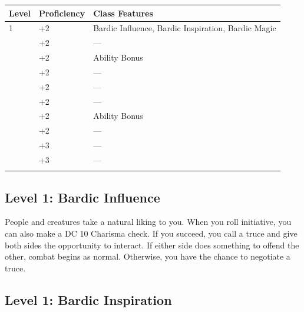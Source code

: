 \documentclass[12pt,letterpaper,twocolumn,openany,nodeprecatedcode,bg=none]{dndbook}
\let\oldsubsection\subsection
\renewcommand{\subsection}[1]{%
  \needspace{5\baselineskip}%
  \oldsubsection{#1}%
}
\begin{document}

{\def\LTcaptype{none} %
\begin{table}[!htbp]
\centering
\begin{tabular}{@{}
  >{\raggedright\arraybackslash}p{}
  >{\raggedright\arraybackslash}p{}
  >{\raggedright\arraybackslash}p{}@{}}
\toprule\noalign{}
\begin{minipage}[b]{\linewidth}\raggedright
Level
\end{minipage} & \begin{minipage}[b]{\linewidth}\raggedright
Proficiency
\end{minipage} & \begin{minipage}[b]{\linewidth}\raggedright
Class Features
\end{minipage} \\
\midrule\noalign{}
1 & +2 & Bardic Influence, Bardic Inspiration, Bardic Magic \\
2 & +2 & --- \\
3 & +2 & Ability Bonus \\
4 & +2 & --- \\
5 & +2 & --- \\
6 & +2 & --- \\
7 & +2 & Ability Bonus \\
8 & +2 & --- \\
9 & +3 & --- \\
10 & +3 & --- \\
\bottomrule\noalign{}
\end{tabular}
\end{table}
}

\subsection{Level 1: Bardic Influence}\label{level-1-bardic-influence}

People and creatures take a natural liking to you. When you roll
initiative, you can also make a DC 10 Charisma check. If you succeed,
you call a truce and give both sides the opportunity to interact. If
either side does something to offend the other, combat begins as normal.
Otherwise, you have the chance to negotiate a truce.

\subsection{Level 1: Bardic
Inspiration}\label{level-1-bardic-inspiration}
\end{document}
